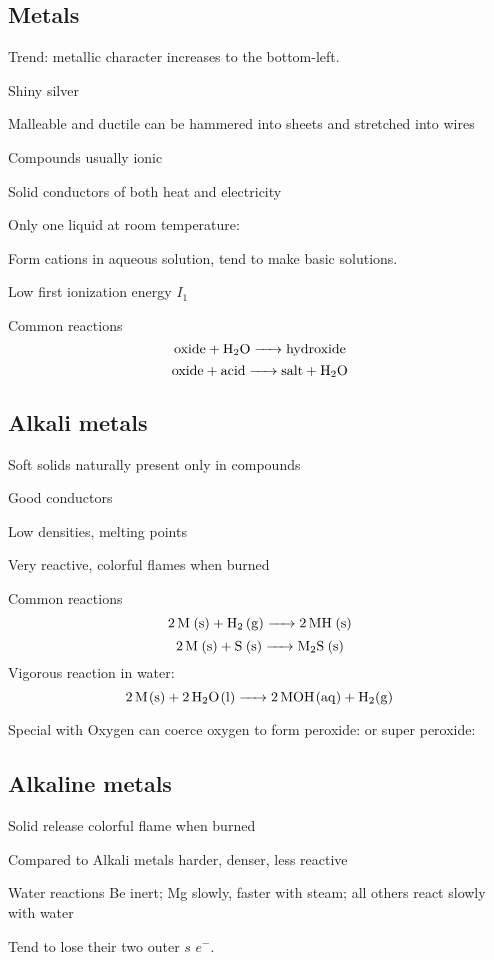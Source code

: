 \begin{mdframed}
\subsection{Metals}
\begin{multicols}{2}

\begin{compactdesc}
\item[Trend:] metallic character increases to the bottom-left.
\item[Shiny] silver
\item[Malleable and ductile] can be hammered into sheets and stretched into
    wires
\item[Compounds] usually ionic
\item[Solid conductors] of both heat and electricity
\item[Only one liquid] at room temperature: 
\item[Form cations] in aqueous solution, tend to make basic solutions.
\item[Low first] ionization energy $I_1$
\item[Common reactions]
 \[\ce{oxide + H2O -> hydroxide}   \]
 \[\ce{oxide + acid -> salt + H2O} \]
\end{compactdesc}

\subsection{Alkali metals}
\begin{compactdesc}
\item[Soft solids] naturally present only in compounds
\item[Good conductors]
\item[Low] densities, melting points
\item[Very] reactive, colorful flames when burned
\item[Common reactions]
    \[\ce{2M (s) + H2 (g) -> 2MH (s) }\]
    \[\ce{2M (s) + S (s) -> M2S (s) }\]
    Vigorous reaction in water:
    \[\ce{2M(s) + 2H2O(l) -> 2MOH(aq) + H2(g)}\]
\item[Special with Oxygen] can coerce oxygen to form peroxide: 
    or super peroxide: 
\end{compactdesc}

\subsection{Alkaline metals}
\begin{compactdesc}
\item[Solid] release colorful flame when burned
\item[Compared to Alkali metals] harder, denser, less reactive
\item[Water reactions] Be inert; Mg slowly, faster with steam; all others react
    slowly with water
\item[Tend to lose] their two outer $s$ $e^-$.
\end{compactdesc}

\end{multicols}
\end{mdframed}


